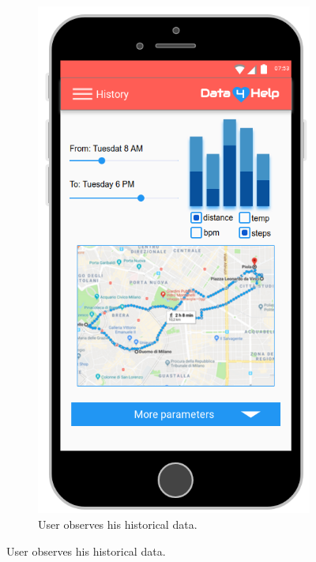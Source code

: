 \begin{figure}[ht]
\begin{subfigure}[t]{0.38\linewidth}
    \includegraphics[width=\linewidth]{images/Mockup/History.png}
    \caption{User observes his historical data.}
  \end{subfigure}
\end{figure}
\clearpage

